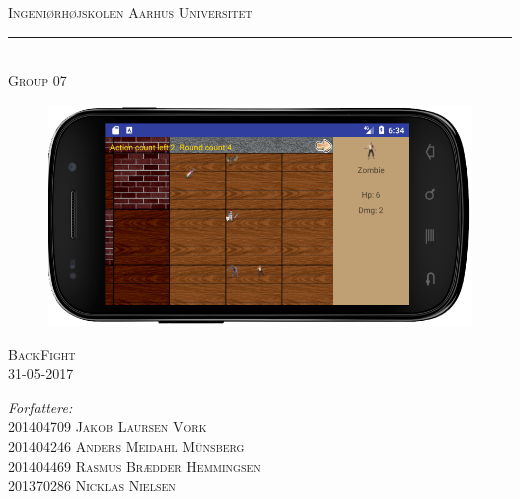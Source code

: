 \begin{titlingpage}
	\center %
	
	\textsc{\LARGE Ingeniørhøjskolen Aarhus Universitet}
	\noindent\hfil\rule{0.9\textwidth}{.4pt}\\[2.5cm]
	\textsc{Group 07}
	
	\begin{figure}[ht!]
		\centering
		\includegraphics[width=130mm]{images/FrontpageImage.png}
	\end{figure}
	

	\begin{vplace}[0.7]
		\textsc{\LARGE BackFight}\\
		\textsc{\large 31-05-2017}\\[0.5cm]		
		\vspace{15mm}
	
		\begin{minipage}{0.55\textwidth}
			\begin{flushleft} \large
				
				\emph{Forfattere:}\\ 
				
				201404709 \textsc{Jakob Laursen Vork}\\
				201404246 \textsc{Anders Meidahl Münsberg}\\
				201404469 \textsc{Rasmus Brædder Hemmingsen}\\
				201370286 \textsc{Nicklas Nielsen}\\
				
			\end{flushleft}
		\end{minipage}

	\end{vplace}	
\end{titlingpage}